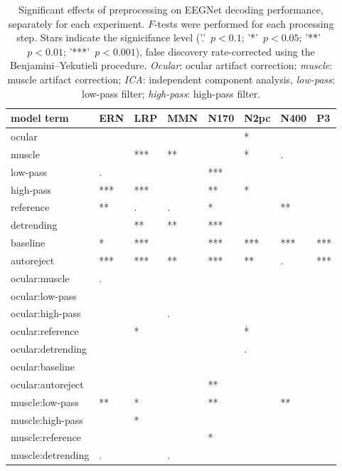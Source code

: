 \begin{table}[!htp]
\begin{widestuff}
\caption{Significant effects of preprocessing on EEGNet decoding performance, separately for each experiment. $F$-tests were performed for each processing step. Stars indicate the signicifance level ('.'~$p<0.1$; '*'~$p<0.05$; '**'~$p<0.01$; '***'~$p<0.001$), false discovery rate-corrected using the Benjamini–Yekutieli procedure. \textit{Ocular}: ocular artifact correction; \textit{muscle}: muscle artifact correction; \textit{ICA}: independent component analysis, \textit{low-pass}: low-pass filter; \textit{high-pass}: high-pass filter.} 
\label{eegnet_omni}
\begin{tabular}{llllllll}
  \hline
model term & ERN & LRP & MMN & N170 & N2pc & N400 & P3 \\ 
  \hline
ocular &   &   &   &   & * &   &   \\ 
  muscle &   & *** & ** &   & * & . &   \\ 
  low-pass & . &   &   & *** &   &   &   \\ 
  high-pass & *** & *** &   & ** & * &   &   \\ 
  reference & ** & . & . & * &   & ** &   \\ 
  detrending &   & ** & ** & *** &   &   &   \\ 
  baseline & * & *** &   & *** & *** & *** & *** \\ 
  autoreject & *** & *** & ** & *** & ** & . & *** \\ 
  ocular:muscle & . &   &   &   &   &   &   \\ 
  ocular:low-pass &   &   &   &   &   &   &   \\ 
  ocular:high-pass &   &   & . &   &   &   &   \\ 
  ocular:reference &   & * &   &   & * &   &   \\ 
  ocular:detrending &   &   &   &   & . &   &   \\ 
  ocular:baseline &   &   &   &   &   &   &   \\ 
  ocular:autoreject &   &   &   & ** &   &   &   \\ 
  muscle:low-pass & ** & * &   & ** &   & ** &   \\ 
  muscle:high-pass &   & * &   &   &   &   &   \\ 
  muscle:reference &   &   &   & * &   &   &   \\ 
  muscle:detrending & . &   & . &   &   &   &   \\ 

\end{tabular}
\end{widestuff}
\end{table}
